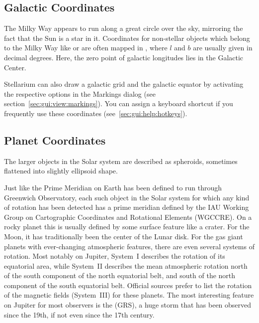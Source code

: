 \subsection{Galactic Coordinates}
\label{sec:Concepts:Galactic}

The Milky Way appears to run along a great circle over the sky,
mirroring the fact that the Sun is a star in it. Coordinates for
non-stellar objects which belong to the Milky Way like
 or  are often mapped
in , 
where  $l$ and 
 $b$ are usually given in decimal
degrees. Here, the zero point of galactic longitudes lies in the
Galactic Center.

Stellarium can also draw a galactic grid and the galactic equator by
activating the respective options in the Markings dialog (see
section~\ref{sec:gui:view:markings}). You can assign a keyboard
shortcut if you frequently use these coordinates
(see~\ref{sec:gui:help:hotkeys}).


\subsection{Planet Coordinates}
\label{sec:Concepts:PlanetCoordinates}

The larger objects in the Solar system are described as spheroids,
sometimes flattened into slightly ellipsoid shape.

Just like the Prime Meridian on Earth has been defined to run through
Greenwich Observatory, each such object in the Solar system for which
any kind of rotation has been detected has a prime meridian defined by
the IAU Working Group on Cartographic Coordinates and Rotational
Elements (WGCCRE). On a rocky planet this is usually defined by some
surface feature like a crater. For the Moon, it has traditionally been
the center of the Lunar disk. For the gas giant planets with
ever-changing atmospheric features, there are even several systems of
rotation. Most notably on Jupiter, System~I describes the rotation of
its equatorial area, while System~II describes the mean atmospheric
rotation north of the south component of the north equatorial belt,
and south of the north component of the south equatorial
belt. Official sources prefer to list the rotation of the magnetic
fields (System~III) for these planets. The most interesting feature on
Jupiter for most observers is the  (GRS), a
huge storm that has been observed since the 19th, if not even since
the 17th century.

